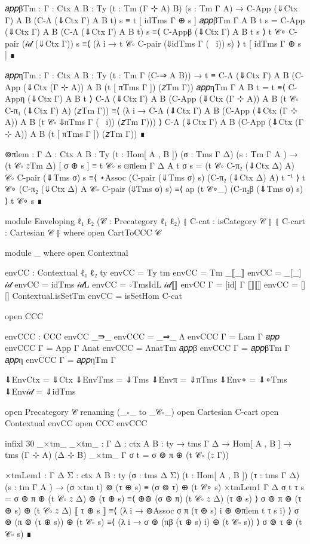 \begin{code}[hide]
  𝑎𝑝𝑝βTm : {Γ : Ctx} {A B : Ty} (t : Tm (Γ ⊹ A) B) (s : Tm Γ A) →
    C-App (⇓Ctx Γ) A B (C-Λ (⇓Ctx Γ) A B t) s ≡ t [ idTms Γ ⊕ s ]
  𝑎𝑝𝑝βTm {Γ} {A} {B} t s =
    C-App (⇓Ctx Γ) A B (C-Λ (⇓Ctx Γ) A B t) s
      ≡⟨ C-Appβ (⇓Ctx Γ) A B t s ⟩
    t 𝒞∘ C-pair (𝒾𝒹 (⇓Ctx Γ)) s
      ≡⟨ (λ i → t 𝒞∘ C-pair (⇓idTms Γ (~ i)) s) ⟩
    t [ idTms Γ ⊕ s ]
      ∎

  𝑎𝑝𝑝ηTm : {Γ : Ctx} {A B : Ty} (t : Tm Γ (C-⇒ A B)) →
    t ≡ C-Λ (⇓Ctx Γ) A B (C-App (⇓Ctx (Γ ⊹ A)) A B (t [ πTms {Γ} ]) (𝑧Tm {Γ}))
  𝑎𝑝𝑝ηTm {Γ} {A} {B} t =
    t
      ≡⟨ C-Appη (⇓Ctx Γ) A B t ⟩
    C-Λ (⇓Ctx Γ) A B (C-App (⇓Ctx (Γ ⊹ A)) A B (t 𝒞∘ C-π₁ (⇓Ctx Γ) A) (𝑧Tm {Γ}))
      ≡⟨ (λ i → C-Λ (⇓Ctx Γ) A B (C-App (⇓Ctx (Γ ⊹ A)) A B (t 𝒞∘ ⇓πTms {Γ} (~ i)) (𝑧Tm {Γ}))) ⟩
    C-Λ (⇓Ctx Γ) A B (C-App (⇓Ctx (Γ ⊹ A)) A B (t [ πTms {Γ} ]) (𝑧Tm {Γ}))
      ∎

  ⊚πlem : {Γ Δ : Ctx} {A B : Ty} (t : Hom[ A , B ]) (σ : Tms Γ Δ) (s : Tm Γ A )  →
    (t 𝒞∘ 𝑧Tm {Δ}) [ σ ⊕ s ] ≡ t 𝒞∘ s
  ⊚πlem {Γ} {Δ} {A} t σ s =
    (t 𝒞∘ C-π₂ (⇓Ctx Δ) A) 𝒞∘ C-pair (⇓Tms σ) s
      ≡⟨ ⋆Assoc (C-pair (⇓Tms σ) s) (C-π₂ (⇓Ctx Δ) A) t ⁻¹ ⟩
    t 𝒞∘ (C-π₂ (⇓Ctx Δ) A 𝒞∘ C-pair (⇓Tms σ) s)
      ≡⟨ ap (t 𝒞∘_) (C-π₂β (⇓Tms σ) s) ⟩
    t 𝒞∘ s
      ∎

module Enveloping {ℓ₁ ℓ₂} (𝒞 : Precategory ℓ₁ ℓ₂)
       ⦃ C-cat : isCategory 𝒞 ⦄ ⦃ C-cart : Cartesian 𝒞 ⦄ where
  open CartToCCC 𝒞

  module _ where
    open Contextual

    envCC : Contextual ℓ₁ ℓ₂
    ty envCC = Ty
    tm envCC = Tm
    _⟦_⟧ envCC = _[_]
    𝒾𝒹 envCC = idTms
    𝒾𝒹L envCC = ∘TmsIdL
    𝒾𝒹⟦⟧ envCC {Γ} = [id] {Γ}
    ⟦⟧⟦⟧ envCC = [][]
    Contextual.isSetTm envCC = isSetHom C-cat

    open CCC

    envCCC : CCC envCC
    _⇛_ envCCC = _⇒_
    Λ envCCC {Γ} = Lam {Γ}
    𝑎𝑝𝑝 envCCC {Γ} = App {Γ}
    Λnat envCCC = ΛnatTm
    𝑎𝑝𝑝β envCCC {Γ} = 𝑎𝑝𝑝βTm {Γ}
    𝑎𝑝𝑝η envCCC {Γ} = 𝑎𝑝𝑝ηTm {Γ}

  ⇓EnvCtx = ⇓Ctx
  ⇓EnvTms = ⇓Tms
  ⇓Envπ = ⇓πTms
  ⇓Env∘ = ⇓∘Tms
  ⇓Env𝒾𝒹 = ⇓idTms

  open Precategory 𝒞 renaming (_∘_ to _𝒞∘_)
  open Cartesian C-cart
  open Contextual envCC
  open CCC envCCC

  infixl 30 _×tm_
  _×tm_ : {Γ Δ : ctx} {A B : ty} → tms Γ Δ → Hom[ A , B ] → tms (Γ ⊹ A) (Δ ⊹ B)
  _×tm_ {Γ} σ t = σ ⊚ π ⊕ (t 𝒞∘ (𝑧 {Γ}))

  ×tmLem1 : {Γ Δ Σ : ctx} {A B : ty} (σ : tms Δ Σ) (t : Hom[ A , B ])
    (τ : tms Γ Δ) (s : tm Γ A ) →
    (σ ×tm t) ⊚ (τ ⊕ s) ≡ (σ ⊚ τ) ⊕ (t 𝒞∘ s)
  ×tmLem1 {Γ} {Δ} σ t τ s =
    σ ⊚ π ⊕ (t 𝒞∘ 𝑧 {Δ}) ⊚ (τ ⊕ s)
      ≡⟨ ⊕⊚ (σ ⊚ π) (t 𝒞∘ 𝑧 {Δ}) (τ ⊕ s) ⟩
    σ ⊚ π ⊚ (τ ⊕ s) ⊕ (t 𝒞∘ 𝑧 {Δ}) ⟦ τ ⊕ s ⟧
      ≡⟨ (λ i → ⊚Assoc σ π (τ ⊕ s) i ⊕ ⊚πlem t τ s i) ⟩
    σ ⊚ (π ⊚ (τ ⊕ s)) ⊕ (t 𝒞∘ s)
      ≡⟨ (λ i → σ ⊚ (πβ (τ ⊕ s) i) ⊕ (t 𝒞∘ s)) ⟩
    σ ⊚ τ ⊕ (t 𝒞∘ s)
      ∎


\end{code}
